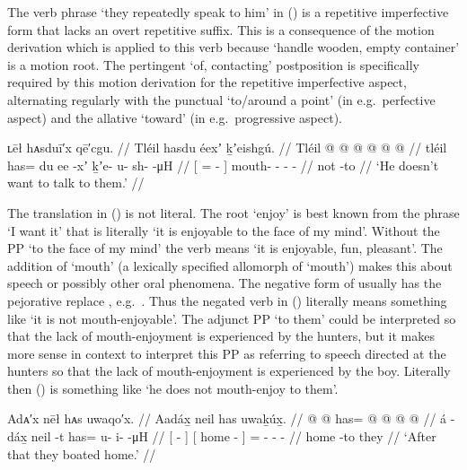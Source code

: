 The verb phrase  ‘they repeatedly speak to him’ in (\lastx) is a repetitive imperfective form that lacks an overt repetitive suffix.
This is a consequence of the motion derivation  which is applied to this verb because  ‘handle wooden, empty container’ is a motion root.
The pertingent  ‘of, contacting’ postposition is specifically required by this motion derivation for the repetitive imperfective aspect, alternating regularly with the punctual  ‘to/around a point’ (in e.g.\ perfective aspect) and the allative  ‘toward’ (in e.g.\ progressive aspect).

\ex\label{ex:106-10-no-talk}%
%
\begingl
	\glpreamble	ʟēł hᴀsduī′x qē′cgu. //
	\glpreamble	Tléil hasdu éexʼ ḵʼeishgú. //
	\gla	Tléil {}  @ {}  @ {} {}
			 @ {} @ {} @ {} @ {} //
	\glb	tléil {} has= du ee -xʼ {} 
			ḵʼe- u- sh-  -μH //
	\glc	{} {}[ =   - {}]
			mouth- - -  - //
	\gld	not {}  {} {} -to {}
			 {} {} {} {} //
	\glft	‘He doesn’t want to talk to them.’
		//
\endgl
\xe

The translation in (\lastx) is not literal.
The root  ‘enjoy’ is best known from the phrase  ‘I want it’ that is literally ‘it is enjoyable to the face of my mind’.
Without the PP  ‘to the face of my mind’ the verb  means ‘it is enjoyable, fun, pleasant’.
The addition of  ‘mouth’ (a lexically specified allomorph of  ‘mouth’) makes this about speech or possibly other oral phenomena.
The negative form of  usually has the pejorative  replace  \parencite{cable:2017c}, e.g.\ .
Thus the negated verb in (\lastx) literally means something like ‘it is not mouth-enjoyable’.
The adjunct PP  ‘to them’ could be interpreted so that the lack of mouth-enjoyment is experienced by the hunters, but it makes more sense in context to interpret this PP as referring to speech directed at the hunters so that the lack of mouth-enjoyment is experienced by the boy.
Literally then (\lastx) is something like ‘he does not mouth-enjoy to them’.

\ex\label{ex:106-11-went-home}%
%
\begingl
	\glpreamble	Adᴀ′x nēł hᴀs uwaqo′x. //
	\glpreamble	Aadáx̱ neil has uwaḵúx̱. //
	\gla	{}  @ {} {} {}  @ {} {} has= @  @ {} @ {} @ {} //
	\glb	{} á -dáx̱ {} {} neil -t {} has= u- i-  -μH //
	\glc	{}[  - {}] {}[ home - {}]
			= - -  - //
	\gld	{}  {} {} {} home -to {} they  {} {} {} //
	\glft	‘After that they boated home.’
		//
\endgl
\xe

